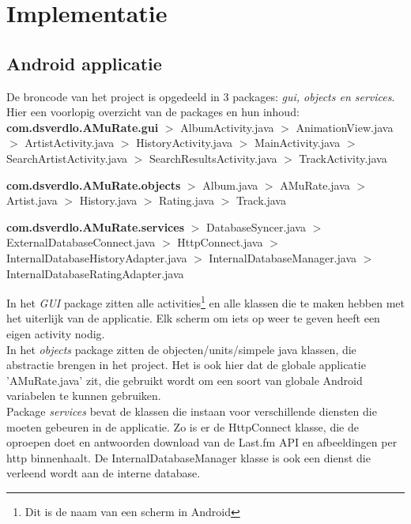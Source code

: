 \documentclass[11pt,a4paper]{article}
\newcommand{\pack}[1]{$>$ #1.java \newline}
\begin{document}


\section{Implementatie}
	\subsection{Android applicatie}
		\normalsize  
		De broncode van het project is opgedeeld in 3 packages: \textit{gui, objects en services}. Hier een voorlopig overzicht van de packages en hun inhoud:\\
		
		 \textbf{com.dsverdlo.AMuRate.gui} \newline		
		 \pack{AlbumActivity}
		 \pack{AnimationView}
		 \pack{ArtistActivity}
		 \pack{HistoryActivity}
		 \pack{MainActivity}
		 \pack{SearchArtistActivity}
		 \pack{SearchResultsActivity} 
		 \pack{TrackActivity}
		 
		\textbf{com.dsverdlo.AMuRate.objects} \newline
		\pack{Album}
		\pack{AMuRate}
		\pack{Artist}
		\pack{History}
		\pack{Rating}
		\pack{Track}
		
		\textbf{com.dsverdlo.AMuRate.services} \newline
		\pack{DatabaseSyncer}
		\pack{ExternalDatabaseConnect}
		\pack{HttpConnect}
		\pack{InternalDatabaseHistoryAdapter}
		\pack{InternalDatabaseManager}
		\pack{InternalDatabaseRatingAdapter}
		
		 In het \textit{GUI} package zitten alle activities\footnote{Dit is de naam van een scherm in Android} en alle klassen die te maken hebben met het uiterlijk van de applicatie. Elk scherm om iets op weer te geven heeft een eigen activity nodig. \\
		In het \textit{objects} package zitten de objecten/units/simpele java klassen, die abstractie brengen in het project. Het is ook hier dat de globale applicatie 'AMuRate.java' zit, die gebruikt wordt om een soort van globale Android variabelen te kunnen gebruiken.  \\
		Package \textit{services} bevat de klassen die instaan voor verschillende diensten die moeten gebeuren in de applicatie. Zo is er de HttpConnect klasse, die de oproepen doet en antwoorden download van de Last.fm API en afbeeldingen per http binnenhaalt. De InternalDatabaseManager klasse is ook een dienst die verleend wordt aan de interne database.
\end{document}
